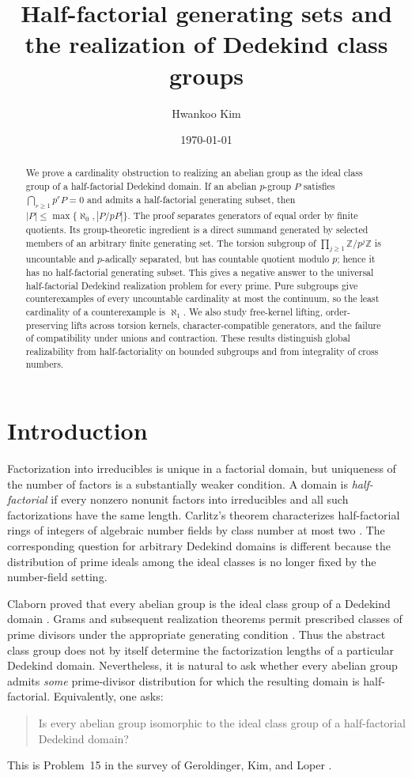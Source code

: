 \documentclass[11pt,reqno]{amsart}
\title[Half-factorial generating sets and class groups]{Half-factorial generating sets and the realization of Dedekind class groups}
\author[H. Kim]{Hwankoo Kim}
\date{\today}
\numberwithin{equation}{section}
\theoremstyle{definition}
\theoremstyle{remark}
\newcommand{\Z}{\mathbb Z}
\begin{document}
\begin{abstract}
We prove a cardinality obstruction to realizing an abelian group as
the ideal class group of a half-factorial Dedekind domain. If an
abelian $p$-group $P$ satisfies $\bigcap_{r\ge1}p^rP=0$ and admits a
half-factorial generating subset, then
$|P|\le\max\{\aleph_0,|P/pP|\}$. The proof separates generators of
equal order by finite quotients. Its group-theoretic ingredient is
a direct summand generated by selected members of an arbitrary
finite generating set. The torsion subgroup of
$\prod_{j\ge1}\Z/p^j\Z$ is uncountable and $p$-adically separated,
but has countable quotient modulo $p$; hence it has no
half-factorial generating subset. This gives a negative answer to
the universal half-factorial Dedekind realization problem for every
prime. Pure subgroups give counterexamples of every uncountable
cardinality at most the continuum, so the least cardinality of a
counterexample is $\aleph_1$. We also study free-kernel lifting,
order-preserving lifts across torsion kernels, character-compatible
generators, and the failure of compatibility under unions and
contraction. These results distinguish global realizability from
half-factoriality on bounded subgroups and from integrality of
cross numbers.
\end{abstract}
\maketitle

\section{Introduction}\label{sec:introduction}

Factorization into irreducibles is unique in a factorial domain, but
uniqueness of the number of factors is a substantially weaker
condition. A domain is \emph{half-factorial} if every nonzero nonunit
factors into irreducibles and all such factorizations have the same
length. Carlitz's theorem characterizes half-factorial rings of
integers of algebraic number fields by class number at most two
\cite{Carlitz}. The corresponding question for arbitrary Dedekind
domains is different because the distribution of prime ideals among
the ideal classes is no longer fixed by the number-field setting.

Claborn proved that every abelian group is the ideal class group of
a Dedekind domain \cite{Claborn}. Grams and subsequent realization
theorems permit prescribed classes of prime divisors under the
appropriate generating condition
\cite{Grams,ChapmanGeroldinger}. Thus the abstract class group does
not by itself determine the factorization lengths of a particular
Dedekind domain. Nevertheless, it is natural to ask whether every
abelian group admits \emph{some} prime-divisor distribution for
which the resulting domain is half-factorial. Equivalently, one asks:
\begin{quote}
Is every abelian group isomorphic to the ideal class group of a
half-factorial Dedekind domain?
\end{quote}
This is Problem~15 in the survey of Geroldinger, Kim, and Loper
\cite[\S12.1]{GKL}.
\end{document}
